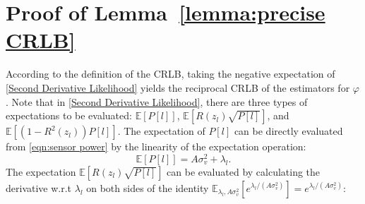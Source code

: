 \documentclass[journal,twocolumn]{IEEEtran}
\theoremstyle{nonumberplain}
\begin{document}
\section{Proof of \textbf{Lemma~\ref{lemma:precise CRLB}}}\label{app:proof of precise CRLB}
    According to the definition of the CRLB, taking the negative expectation of \eqref{Second Derivative Likelihood} yields the reciprocal CRLB of the estimators for $\varphi$. Note that in \eqref{Second Derivative Likelihood}, there are three types of expectations to be evaluated: $\mathbb{E}\left[P[l]\right]$, $\mathbb{E}\left[R(z_l)\sqrt{P[l]}\right]$, and $\mathbb{E}\left[(1-R^2(z_l))P[l]\right]$. The expectation of $P[l]$ can be directly evaluated from \eqref{eqn:sensor power} by the linearity of the expectation operation:
    \begin{equation}
        \mathbb{E}\left[P[l]\right] = A\sigma_v^2 + \lambda_l.
        \label{eqn:expectation of P_l}
    \end{equation}
    The expectation $\mathbb{E}\left[R(z_l) \sqrt{P[l]}\right]$ can be evaluated by calculating the derivative w.r.t $\lambda_l$ on both sides of the identity $\mathbb{E}_{\lambda_l, A\sigma_v^2}[e^{\lambda_l/(A\sigma_v^2)}]=e^{\lambda_l/(A\sigma_v^2)}$:
\end{document}
